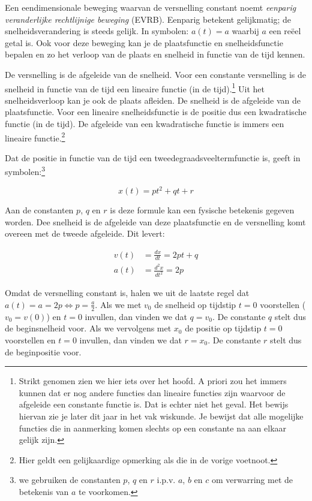 \documentclass{ximera}
\begin{document}
	\author{Bart Lambregs}
    \xmsource\xmuitleg



Een eendimensionale beweging waarvan de versnelling constant noemt  \textit{eenparig veranderlijke rechtlijnige be\-we\-ging} (EVRB). Eenparig betekent gelijkmatig; de snelheidsverandering is steeds gelijk. In symbolen: $a(t)=a$ waarbij $a$ een reëel getal is. Ook voor deze beweging kan je de plaatsfunctie en snelheidsfunctie bepalen en zo het verloop van de plaats en snelheid in functie van de tijd kennen. 

De versnelling is de afgeleide van de snelheid. Voor een constante versnelling is de snelheid in functie van de tijd een lineaire functie (in de tijd).\footnote{Strikt genomen zien we hier iets over het hoofd. A priori zou het immers kunnen dat er nog andere functies dan lineaire functies zijn waarvoor de afgeleide een constante functie is. Dat is echter niet het geval. Het bewijs hiervan zie je later dit jaar in het vak wiskunde. Je bewijst dat alle mogelijke functies die in aanmerking komen slechts op een constante na aan elkaar gelijk zijn.} Uit het snelheidsverloop kan je ook de plaats afleiden. De snelheid is de afgeleide van de plaatsfunctie. Voor een lineaire snelheidsfunctie is de positie dus een kwadratische functie (in de tijd). De afgeleide van een kwadratische functie is immers een lineaire functie.\footnote{Hier geldt een gelijkaardige opmerking als die in de vorige voetnoot.}

Dat de positie in functie van de tijd een tweedegraadsveeltermfunctie is, geeft in symbolen:\footnote{we gebruiken de constanten $p$, $q$ en $r$ i.p.v. $a$, $b$ en $c$ om verwarring met de betekenis van $a$ te voorkomen.}

\[
x(t)=pt^2+qt+r
\]

Aan de constanten $p$, $q$ en $r$ is deze formule kan een fysische betekenis gegeven worden. Dee snelheid is de afgeleide van deze plaatsfunctie en de versnelling komt overeen met de tweede afgeleide. Dit levert: 

\[
\begin{array}{rl}
v(t)&=\frac{dx}{dt}=2pt+q\\
a(t)&=\frac{d^2x}{dt^2}=2p%
\end{array}
\]

Omdat de versnelling constant is, halen we uit de laatste regel dat $a(t)=a=2p\Leftrightarrow p=\frac{a}{2}$. Als we met $v_0$ de snelheid op tijdstip $t=0$ voorstellen ($v_0=v(0)$) en $t=0$ invullen, dan vinden we dat $q=v_0$. De constante $q$ stelt dus de beginsnelheid voor. Als we vervolgens met $x_0$ de positie op tijdstip $t=0$ voorstellen en $t=0$ invullen, dan vinden we dat $r=x_0$. De constante $r$ stelt dus de beginpositie voor.
\end{document}
